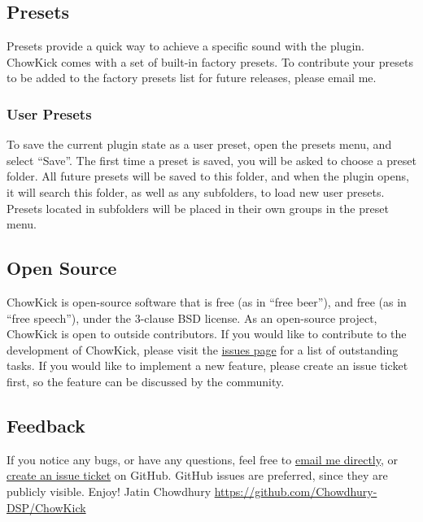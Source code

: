 \documentclass[landscape,twocolumn,a5paper]{manual}
\begin{document}
\subsection{Presets}
Presets provide a quick way to achieve a specific sound
with the plugin. ChowKick comes with a set of built-in
factory presets. To contribute your presets to be added
to the factory presets list for future releases, please
email me.

\subsubsection{User Presets}
To save the current plugin state as a user preset, open
the presets menu, and select ``Save''. The first time a
preset is saved, you will be asked to choose a preset
folder. All future presets will be saved to this folder,
and when the plugin opens, it will search this folder, as
well as any subfolders, to load new user presets.
Presets located in subfolders will be placed in their
own groups in the preset menu.
\newpar

\subsection{Open Source}
ChowKick is open-source software that is free (as in ``free
beer''), and free (as in ``free speech''), under the
3-clause BSD license.
\newpar
As an open-source project, ChowKick is
open to outside contributors. If you would like to contribute
to the development of ChowKick, please visit the
\href{https://github.com/Chowdhury-DSP/ChowKick/issues}{issues page}
for a list of outstanding tasks. If you would like to implement
a new feature, please create an issue ticket first, so the
feature can be discussed by the community.

\subsection{Feedback}
If you notice any bugs, or have any questions, feel free
to \href{mailto:chowdsp@gmail.com}{email me directly},
or \href{https://github.com/Chowdhury-DSP/ChowKick/issues}{create an issue ticket}
on GitHub. GitHub issues are preferred, since they are publicly
visible.
\newpar
Enjoy!
\newpar
Jatin Chowdhury
\newpar
\href{https://github.com/Chowdhury-DSP/ChowKick}{https://github.com/Chowdhury-DSP/ChowKick}
\end{document}
